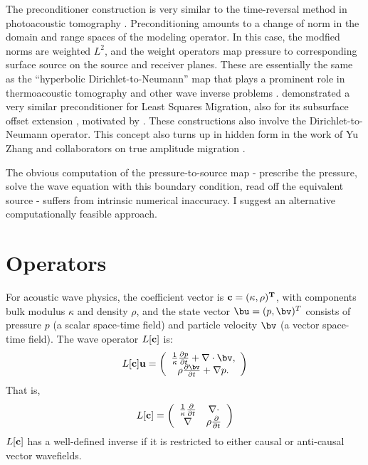 The preconditioner construction is very similar to the time-reversal
method in photoacoustic tomography
\cite[]{StefanovUhlmannIP:09}. Preconditioning amounts to a change of
norm in the domain and range spaces of the modeling operator. In this
case, the modfied norms are weighted $L^2$, and the weight operators
map pressure to corresponding surface source on the source and
receiver planes. These are essentially the same as the ``hyperbolic
Dirichlet-to-Neumann'' map that plays a prominent role in
thermoacoustic tomography and other wave inverse problems
\cite[]{Rachele:00,StefUhl:05}. \cite{HouSymes:EAGE16} demonstrated a
very similar preconditioner for Least Squares Migration, also for its
subsurface offset extension \cite[]{HouSymes:16}, motivated by
\cite{tenKroode:12}. These constructions also involve the
Dirichlet-to-Neumann operator. This concept also turns up in hidden
form in the work of Yu Zhang and collaborators on true amplitude
migration
\cite[]{YuZhang:14,TangXuZhang:13,XuWang:2012,XuZhangTang:11,Zhang:SEG09}.

The obvious computation of the pressure-to-source map
- prescribe the pressure, solve the wave equation with this boundary
condition, read off the equivalent source - suffers from intrinsic
numerical inaccuracy. I suggest an alternative computationally
feasible approach.

\section{Operators}

For acoustic wave physics, the coefficient vector is
$\bf{c}=(\kappa,\rho)^T$, with components bulk modulus $\kappa$ and
density $\rho$, and the state vector $\bu=(p,\bv)^T$ consists of
pressure $p$ (a scalar space-time field) and particle velocity $\bv$
(a vector space-time field). The wave operator $L[\bf{c}]$ is:
\begin{equation}
\label{eqn:aweop}
L[\bf{c}]\bf{u} = 
\left(
\begin{array}{c}
\frac{1}{\kappa}\frac{\partial p}{\partial t}  + \nabla \cdot \bv, \\
\rho\frac{\partial \bv}{\partial t} + \nabla p.
\end{array}
\right) 
\end{equation}
That is,
\begin{equation}
  \label{eqn:awemat}
  L[{\bf c}] = \left(
    \begin{array}{cc}
      \frac{1}{\kappa}\frac{\partial}{\partial t} & \nabla \cdot \\
      \nabla & \rho \frac{\partial}{\partial t}
    \end{array}
  \right)
\end{equation}
$L[{\bf c}]$ has a well-defined inverse if it is restricted to either
causal or anti-causal vector wavefields.


